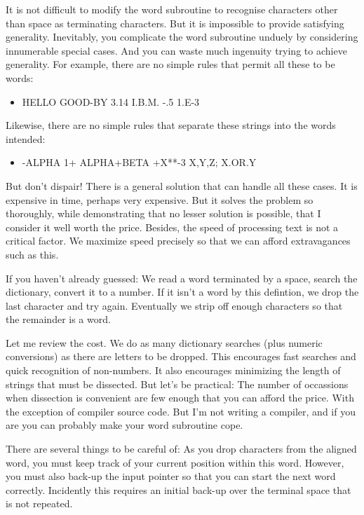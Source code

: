 \documentclass[b5paper, oneside]{book}
\begin{document}
It is not difficult to modify the word subroutine to recognise characters other than space as terminating characters. But it is impossible to provide satisfying generality. Inevitably, you complicate the word subroutine unduely by considering innumerable special cases. And you can waste much ingenuity trying to achieve generality. For example, there are no simple rules that permit all these to be words:\begin{itemize}
   \item HELLO GOOD-BY 3.14 I.B.M. -.5 1.E-3\end{itemize}
Likewise, there are no simple rules that separate these strings into the words intended:\begin{itemize}
   \item -ALPHA 1+ ALPHA+BETA +X**-3 X,Y,Z; X.OR.Y\end{itemize}
But don't dispair! There is a general solution that can handle all these cases. It is expensive in time, perhaps very expensive. But it solves the problem so thoroughly, while demonstrating that no lesser solution is possible, that I consider it well worth the price. Besides, the speed of processing text is not a critical factor. We maximize speed precisely so that we can afford extravagances such as this.

If you haven't already guessed: We read a word terminated by a space, search the dictionary, convert it to a number. If it isn't a word by this defintion, we drop the last character and try again. Eventually we strip off enough characters so that the remainder is a word.

Let me review the cost. We do as many dictionary searches (plus numeric conversions) as there are letters to be dropped. This encourages fast searches and quick recognition of non-numbers. It also encourages minimizing the length of strings that must be dissected. But let's be practical: The number of occassions when dissection is convenient are few enough that you can afford the price. With the exception of compiler source code. But I'm not writing a compiler, and if you are you can probably make your word subroutine cope.

There are several things to be careful of: As you drop characters from the aligned word, you must keep track of your current position within this word. However, you must also back-up the input pointer so that you can start the next word correctly. Incidently this requires an initial back-up over the terminal space that is not repeated.
\end{document}
